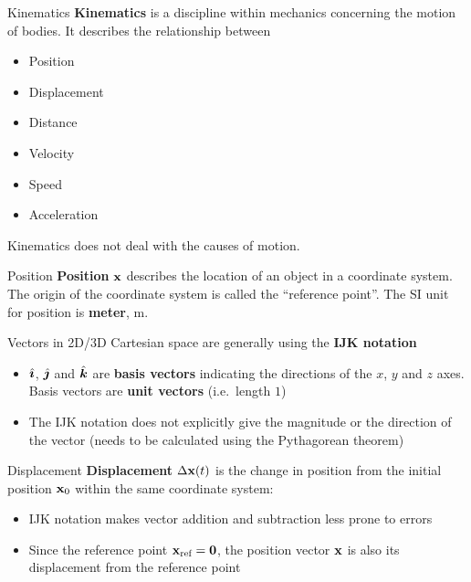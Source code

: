 \documentclass[12pt,compress,aspectratio=169]{beamer}
\newcommand{\iii}{\ensuremath\hat{\bm{\imath}}}
\newcommand{\jjj}{\ensuremath\hat{\bm{\jmath}}}
\newcommand{\kkk}{\ensuremath\hat{\bm{k}}}
\newcommand{\mb}[1]{\ensuremath\mathbf{#1}}
\newcommand{\eq}[2]{\vspace{#1}{\Large\begin{displaymath}#2\end{displaymath}}}
\begin{document}
\begin{frame}{Kinematics}
  \textbf{Kinematics} is a discipline within mechanics concerning the
  motion of bodies. It describes the relationship between 
  \begin{itemize}
  \item<alert@1> Position
  \item<alert@1> Displacement
  \item Distance 
  \item<alert@1> Velocity
  \item Speed
  \item<alert@1> Acceleration
  \end{itemize}
  Kinematics does not deal with the causes of motion.
\end{frame}



\begin{frame}{Position}
  \textbf{Position} $\mb{x}$ describes the location of an object in a
  coordinate system.%
  The origin of the coordinate system is called the ``reference point''.
  The SI unit for position is \textbf{meter}, \si{\metre}.
  
  \eq{-.2in}{
    \boxed{\mb{x}(t)=x(t)\iii + y(t)\jjj + z(t)\kkk}
  }

  Vectors in 2D/3D Cartesian space are generally using the
  \textbf{IJK notation}
  \begin{itemize}
  \item $\iii$, $\jjj$ and $\kkk$ are \textbf{basis vectors} indicating the
    directions of the $x$, $y$ and $z$ axes. Basis vectors are
    \textbf{unit vectors} (i.e.\ length $1$)
  \item The IJK notation does not explicitly give the magnitude or the direction
    of the vector (needs to be calculated using the Pythagorean theorem)
  \end{itemize}
\end{frame}



\begin{frame}{Displacement}
  \textbf{Displacement} $\Delta\mb{x}(t)$ is the change in position from the
  initial position $\mb{x}_0$ within the same coordinate system:

  \eq{-.25in}{
    \boxed{
      \Delta\mb{x}(t)=\mb{x}(t)-\mb{x}_0
      =(x-x_0)\iii + (y-y_0)\jjj + (z-z_0)\kkk
    }
  }
  \begin{itemize}
  \item IJK notation makes vector addition and subtraction less prone to errors
  \item Since the reference point $\mb{x}_{\textrm{ref}}=\mb{0}$, the position
    vector $\mb{x}$ is also its displacement from the reference point
  \end{itemize}
\end{frame}
\end{document}
